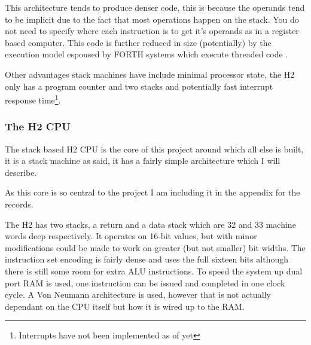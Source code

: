 \documentclass	[a4paper, 10pt]	{article}
\begin{document}
    This architecture tends to produce denser code\cite{newwave}, this is because the operands 
    tend to
    be implicit due to the fact that most operations happen on the stack. You do not need
    to specify where each instruction is to get it's operands as in a register based
    computer. This code is further reduced in size (potentially) by the execution model
    espoused by FORTH systems which execute threaded code \cite{threadedCode}. 

    Other advantages stack machines have include minimal processor state, the H2 only has
    a program counter and two stacks and potentially fast interrupt response time\footnote{Interrupts
    have not been implemented as of yet}.

    \subsubsection{The H2 CPU}

    The stack based H2 CPU is the core of this project around which all else is built, it
    is a stack machine as said, it has a fairly simple architecture which I will describe.

    As this core is so central to the project I am including it in the appendix for the
    records.

    The H2 has two stacks, a return and a data stack which are 32 and 33 machine words deep
    respectively. It operates on 16-bit values, but with minor modifications could be made
    to work on greater (but not smaller) bit widths. The instruction set encoding is fairly
    dense and uses the full sixteen bits although there is still some room for extra ALU
    instructions. To speed the system up dual port RAM is used, one instruction can be
    issued and completed in one clock cycle. A Von Neumann architecture is used, however that
    is not actually dependant on the CPU itself but how it is wired up to the RAM. 
\end{document}
